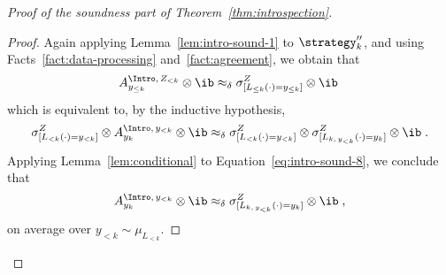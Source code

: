 \begin{proof}[Proof of the soundness part of Theorem~\ref{thm:introspection}]
\begin{proof}
    Again applying Lemma~\ref{lem:intro-sound-1} to $\strategy_k''$, and using
    Facts~\ref{fact:data-processing} and~\ref{fact:agreement}, we obtain that
    \begin{equation*}
      \aizk[y_{\le k}] \otimes \ib \approx_\delta \zLlek \otimes \ib\;
    \end{equation*}
    which is equivalent to, by the inductive hypothesis,
    \begin{equation}\label{eq:intro-sound-8}
      \zLlk \otimes \aigek[y_k] \otimes \ib \approx_\delta \zLlk \otimes \zLk
      \otimes \ib\;.
    \end{equation}
    Applying Lemma~\ref{lem:conditional} to Equation~\eqref{eq:intro-sound-8},
    we conclude that
    \begin{equation}\label{eq:consistency-equation}
      \aigek[y_k] \otimes \ib \approx_\delta
      \zLk \otimes \ib\;,
    \end{equation}
    on average over $y_{<k} \sim \mu_{L_{<k}}$.
  

\end{proof}
\end{proof}
